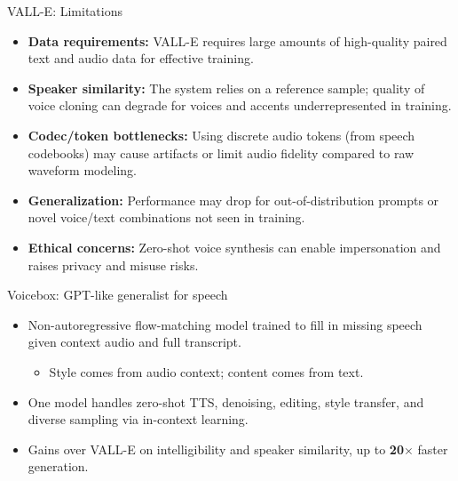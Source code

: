 \begin{frame}{VALL-E: Limitations}
  \begin{itemize}\footnotesize
    \item \textbf{Data requirements:} VALL-E requires large amounts of high-quality paired text and audio data for effective training.
    \item \textbf{Speaker similarity:} The system relies on a reference sample; quality of voice cloning can degrade for voices and accents underrepresented in training.
    \item \textbf{Codec/token bottlenecks:} Using discrete audio tokens (from speech codebooks) may cause artifacts or limit audio fidelity compared to raw waveform modeling.
    \item \textbf{Generalization:} Performance may drop for out-of-distribution prompts or novel voice/text combinations not seen in training.
    \item \textbf{Ethical concerns:} Zero-shot voice synthesis can enable impersonation and raises privacy and misuse risks.
  \end{itemize}
\end{frame}

\begin{frame}{Voicebox: GPT-like generalist for speech}
  \begin{itemize}\footnotesize
    \item Non-autoregressive flow-matching model trained to fill in missing speech given context audio and full transcript.
    \begin{itemize}
      \item Style comes from audio context; content comes from text.
    \end{itemize}
    \item One model handles zero-shot TTS, denoising, editing, style transfer, and diverse sampling via in-context learning.
    \item Gains over VALL-E on intelligibility and speaker similarity, up to \textbf{20$\times$} faster generation.
  \end{itemize}
\end{frame}

